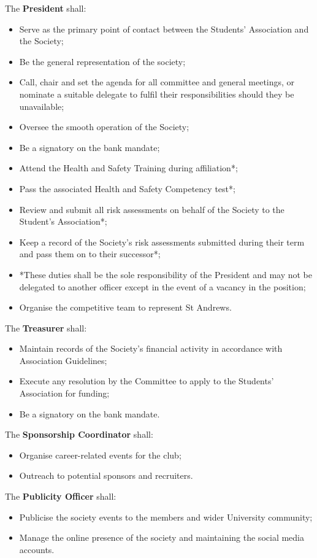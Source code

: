 \documentclass[11pt]{article}
\begin{document}
\begin{enumerate}[label = \Roman*.]
The \textbf{President} shall:
\begin{itemize}
\item Serve as the primary point of contact between the Students' Association and the Society;
\item Be the general representation of the society;
\item Call, chair and set the agenda for all committee and general meetings, or nominate a suitable delegate to fulfil their responsibilities should they be unavailable;
\item Oversee the smooth operation of the Society;
\item Be a signatory on the bank mandate;
\item Attend the Health and Safety Training during affiliation*;
\item Pass the associated Health and Safety Competency test*;
\item Review and submit all risk assessments on behalf of the Society to the Student's Association*;
\item Keep a record of the Society's risk assessments submitted during their term and pass them on to their successor*;
\item *These duties shall be the sole responsibility of the President and may not be delegated to another officer except in the event of a vacancy in the position;
\item Organise the competitive team to represent St Andrews.
\end{itemize}

The \textbf{Treasurer} shall:
\begin{itemize}
\item Maintain records of the Society's financial activity in accordance with Association Guidelines;
\item Execute any resolution by the Committee to apply to the Students' Association for funding;
\item Be a signatory on the bank mandate.
\end{itemize}

The \textbf{Sponsorship Coordinator} shall:
\begin{itemize}
\item Organise career-related events for the club;
\item Outreach to potential sponsors and recruiters.
\end{itemize}

The \textbf{Publicity Officer} shall:
\begin{itemize}
\item Publicise the society events to the members and wider University community;
\item Manage the online presence of the society and maintaining the social media accounts.
\end{itemize}


\end{enumerate}
\end{document}
